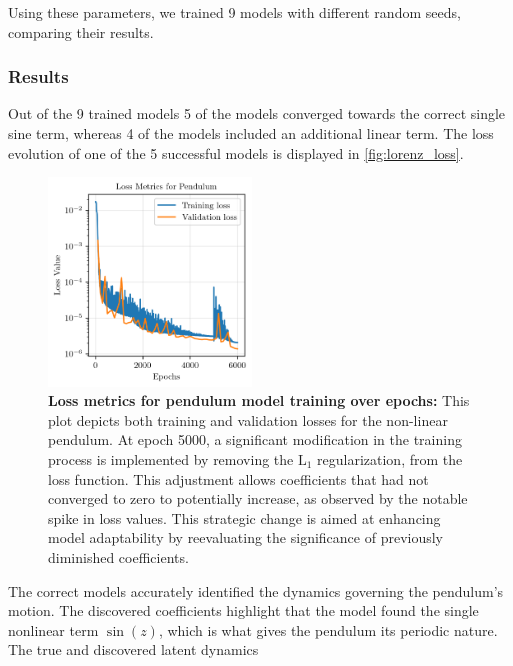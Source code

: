 Using these parameters, we trained 9 models with different random seeds, comparing their results. 

\subsubsection{Results}
Out of the 9 trained models 5 of the models converged towards the correct single sine term, whereas 4 of the models included an additional linear term. 
The loss evolution of one of the 5 successful models is displayed in \autoref{fig:lorenz_loss}.

\begin{figure}[!htbp]
    \centering
    \includegraphics[width=0.48\textwidth]{project_2/images/Loss Metrics for Pendulum.png}
    \vspace{-8mm}
    \caption{\textbf{Loss metrics for pendulum model training over epochs:} This plot depicts both training and validation losses for the non-linear pendulum. At epoch 5000, a significant modification in the training process is implemented by removing the \(\text{L}_1\) regularization, from the loss function. This adjustment allows coefficients that had not converged to zero to potentially increase, as observed by the notable spike in loss values. This strategic change is aimed at enhancing model adaptability by reevaluating the significance of previously diminished coefficients.}
    \label{fig:lorenz_loss}
\end{figure}

The correct models accurately identified the dynamics governing the pendulum's motion. 
The discovered coefficients highlight that the model found the single nonlinear term $\sin (z)$, which is what gives the pendulum its periodic nature. 
The true and discovered latent dynamics 


